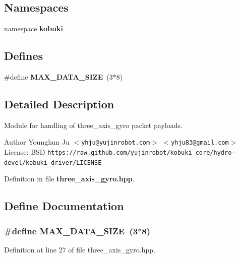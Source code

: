 \subsection*{\-Namespaces}
\begin{DoxyCompactItemize}
\item 
namespace {\bf kobuki}
\end{DoxyCompactItemize}
\subsection*{\-Defines}
\begin{DoxyCompactItemize}
\item 
\#define {\bf \-M\-A\-X\-\_\-\-D\-A\-T\-A\-\_\-\-S\-I\-Z\-E}~(3$\ast$8)
\end{DoxyCompactItemize}


\subsection{\-Detailed \-Description}
\-Module for handling of three\-\_\-axis\-\_\-gyro packet payloads. \begin{DoxyAuthor}{\-Author}
\-Younghun \-Ju $<${\tt yhju@yujinrobot.\-com}$>$ $<${\tt yhju83@gmail.\-com}$>$ \-License\-: \-B\-S\-D {\tt https\-://raw.\-github.\-com/yujinrobot/kobuki\-\_\-core/hydro-\/devel/kobuki\-\_\-driver/\-L\-I\-C\-E\-N\-S\-E} 
\end{DoxyAuthor}


\-Definition in file {\bf three\-\_\-axis\-\_\-gyro.\-hpp}.



\subsection{\-Define \-Documentation}
\subsubsection[{\-M\-A\-X\-\_\-\-D\-A\-T\-A\-\_\-\-S\-I\-Z\-E}]{\setlength{\rightskip}{0pt plus 5cm}\#define {\bf \-M\-A\-X\-\_\-\-D\-A\-T\-A\-\_\-\-S\-I\-Z\-E}~(3$\ast$8)}\label{three__axis__gyro_8hpp_a87f68e96fb938eddc39ad1f19d923a96}


\-Definition at line 27 of file three\-\_\-axis\-\_\-gyro.\-hpp.

